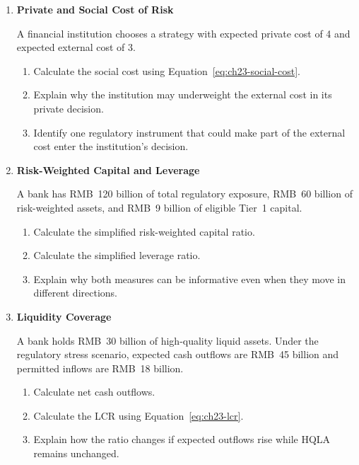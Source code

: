
\begin{enumerate}

\item \textbf{Private and Social Cost of Risk}

A financial institution chooses a strategy with expected private cost of 4 and expected external cost of 3.

\begin{enumerate}
\item Calculate the social cost using Equation~\eqref{eq:ch23-social-cost}.
\item Explain why the institution may underweight the external cost in its private decision.
\item Identify one regulatory instrument that could make part of the external cost enter the institution's decision.
\end{enumerate}


\item \textbf{Risk-Weighted Capital and Leverage}

A bank has RMB~120 billion of total regulatory exposure, RMB~60 billion of risk-weighted assets, and RMB~9 billion of eligible Tier~1 capital.

\begin{enumerate}
\item Calculate the simplified risk-weighted capital ratio.
\item Calculate the simplified leverage ratio.
\item Explain why both measures can be informative even when they move in different directions.
\end{enumerate}


\item \textbf{Liquidity Coverage}

A bank holds RMB~30 billion of high-quality liquid assets. Under the regulatory stress scenario, expected cash outflows are RMB~45 billion and permitted inflows are RMB~18 billion.

\begin{enumerate}
\item Calculate net cash outflows.
\item Calculate the LCR using Equation~\eqref{eq:ch23-lcr}.
\item Explain how the ratio changes if expected outflows rise while HQLA remains unchanged.
\end{enumerate}



\end{enumerate}
